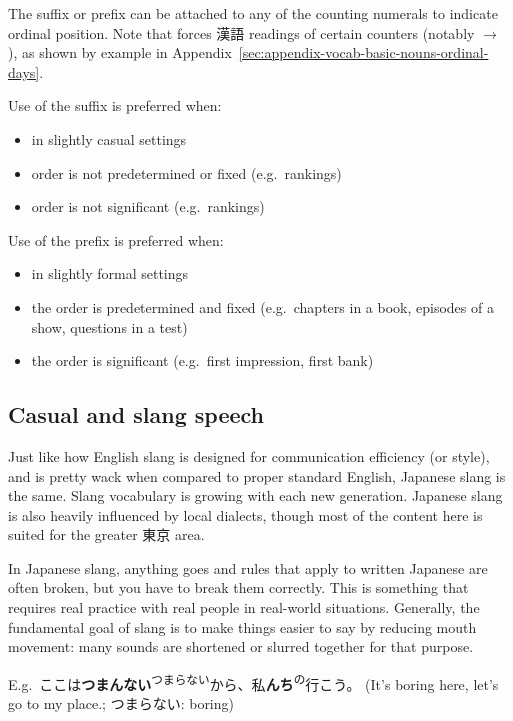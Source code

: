\documentclass[../nihongo-gakushuu-kyouzai.tex]{subfiles}
\begin{document}
The  suffix or  prefix can be attached to any of the counting numerals to indicate ordinal position. Note that  forces 漢語 readings of certain counters (notably  $\to$ ), as shown by example in Appendix~\ref{sec:appendix-vocab-basic-nouns-ordinal-days}.

Use of the  suffix is preferred when:
\begin{itemize}
    \item in slightly casual settings
    \item order is not predetermined or fixed (e.g.\ rankings)
    \item order is not significant (e.g.\ rankings)
\end{itemize}

Use of the  prefix is preferred when:
\begin{itemize}
    \item in slightly formal settings
    \item the order is predetermined and fixed (e.g.\ chapters in a book, episodes of a show, questions in a test)
    \item the order is significant (e.g.\ first impression, first bank)
\end{itemize}


\subsection{Casual and slang speech} \label{sec:casual-and-slang-speech}
Just like how English slang is designed for communication efficiency (or style), and is pretty wack when compared to proper standard English, Japanese slang is the same. Slang vocabulary is growing with each new generation. Japanese slang is also heavily influenced by local dialects, though most of the content here is suited for the greater 東京 area.

In Japanese slang, anything goes and rules that apply to written Japanese are often broken, but you have to break them correctly. This is something that requires real practice with real people in real-world situations. Generally, the fundamental goal of slang is to make things easier to say by reducing mouth movement: many sounds are shortened or slurred together for that purpose.

E.g.\ ここは\textbf{つまんない}\textsuperscript{つまらない}から、私\textbf{んち}\textsuperscript{の}行こう。 (It's boring here, let's go to my place.; つまらない: boring)
\end{document}

